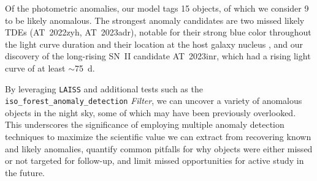 \documentclass[twocolumn]{aastex63}
\newcommand{\laiss}{\texttt{LAISS}}
\begin{document}
Of the photometric anomalies, our model tags 15 objects, of which we consider 9 to be likely anomalous. The strongest anomaly candidates are two missed likely TDEs (AT~2022zyh, AT~2023adr), notable for their strong blue color throughout the light curve duration and their location at the host galaxy nucleus \citep{vanVelzen2019}, and our discovery of the long-rising SN~II candidate AT~2023inr, which had a rising light curve of at least $\sim$75~d. \par

By leveraging \laiss{} and additional tests such as the \texttt{iso\_forest\_anomaly\_detection} \emph{Filter}, we can uncover a variety of anomalous objects in the night sky, some of which may have been previously overlooked. This underscores the significance of employing multiple anomaly detection techniques to maximize the scientific value we can extract from recovering known and likely anomalies, quantify common pitfalls for why objects were either missed or not targeted for follow-up, and limit missed opportunities for active study in the future. \par
\end{document}
